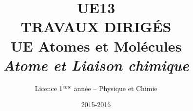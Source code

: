 \documentclass[12pt,french,dvips]{report}
\title{{\Huge \textbf{UE13  \\ 
TRAVAUX DIRIG\'ES  \\[1.5cm] 
UE Atomes et Mol\'ecules \\
\textsl{Atome et Liaison chimique}}}\\[3cm]
\vspace{2cm}}
\author{Licence 1$^{\grave{e}me}$ ann\'ee -- Physique et Chimie}
\date{2015-2016}
\begin{document}

\newcommand{\secd}{\alpha - \varepsilon_i}
\newcommand{\bulletd}{\small \begin{tabular}{c} $\bullet$ \\[-0.3cm] $\bullet$ \\ \end{tabular}}

\newcommand{\bra}{\left\langle}
\newcommand{\ket}{\right\rangle}

\pagestyle{empty}
\maketitle

\cleardoublepage


\pagestyle{plain}
\tableofcontents

\cleardoublepage





%
%
%




\cleardoublepage

\pagestyle{empty}



%
%
\end{document}
